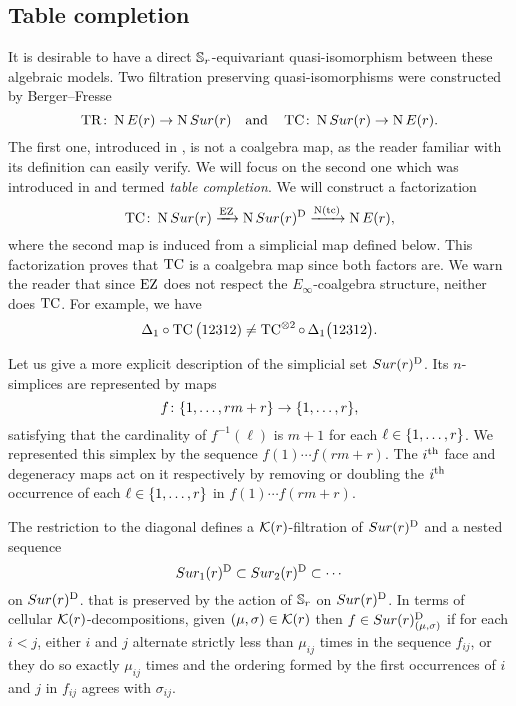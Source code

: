 
\subsection{Table completion}\label{ss:table completion}

It is desirable to have a direct $\mathbb{S}_r$-equivariant quasi-isomorphism between these algebraic models.
Two filtration preserving quasi-isomorphisms were constructed by Berger--Fresse
\[
\operatorname{TR} \colon \operatorname{N}E(r) \to \operatorname{N}Sur(r)
\quad \text{and} \quad
\operatorname{TC} \colon \operatorname{N}Sur(r) \to \operatorname{N} E(r).
\]
The first one, introduced in \cite[1$\cdot$3]{berger2004combinatorial}, is not a coalgebra map, as the reader familiar with its definition can easily verify.
We will focus on the second one which was introduced in \cite{berger2002prismatic} and termed \textit{table completion}.
We will construct a factorization
\[
\operatorname{TC} \colon \operatorname{N}Sur(r) \xrightarrow{\operatorname{EZ}} \operatorname{N}Sur(r)^{\mathrm{D}} \xrightarrow{\operatorname{N}(\operatorname{tc})} \operatorname{N} E(r),
\]
where the second map is induced from a simplicial map defined below.
This factorization proves that $\operatorname{TC}$ is a coalgebra map since both factors are.
We warn the reader that since $\operatorname{EZ}$ does not respect the $E_\infty$-coalgebra structure,
neither does $\operatorname{TC}$.
For example, we have
\[
\Delta_1 \circ \operatorname{TC}\big(12312) \neq \operatorname{TC}^{\otimes 2} \circ \, \Delta_1 \big(12312\big).
\]

Let us give a more explicit description of the simplicial set $Sur(r)^{\mathrm{D}}$.
Its $n$-simplices are represented by maps
\[
f \colon \{1,\dots,rm+r\} \to \{1,\dots,r\},
\]
satisfying that the cardinality of $f^{-1}(\ell)$ is $m+1$ for each $\ell \in \{1,\dots,r\}$.
We represented this simplex by the sequence $f(1) \dotsb f(rm+r)$.
The $i^{\mathrm{th}}$ face and degeneracy maps act on it respectively by removing or doubling the $i^{\mathrm{th}}$ occurrence of each $\ell \in \{1,\dots,r\}$ in $f(1) \dotsb f(rm+r)$.

The restriction to the diagonal defines a $\mathcal{K}(r)$-filtration 
of $Sur(r)^{\mathrm{D}}$ and a nested sequence
\[
Sur_1(r)^{\mathrm{D}} \subset Sur_2(r)^{\mathrm{D}} \subset \dotsb
\]
on $Sur(r)^{\mathrm{D}}$.
that is preserved by the action of $\mathbb{S}_r$ on $Sur(r)^{\mathrm{D}}$.
In terms of cellular $\mathcal{K}(r)$-decompositions, given $(\mu,\sigma) \in \mathcal{K}(r)$ then $f \in Sur(r)^{\mathrm{D}}_{(\mu,\sigma)}$ if for each $i<j$, either $i$ and $j$ alternate strictly less than $\mu_{ij}$ times in the sequence $f_{ij}$, or they do so exactly $\mu_{ij}$ times and the ordering formed by the first occurrences of $i$ and $j$ in $f_{ij}$ agrees with $\sigma_{ij}$.

